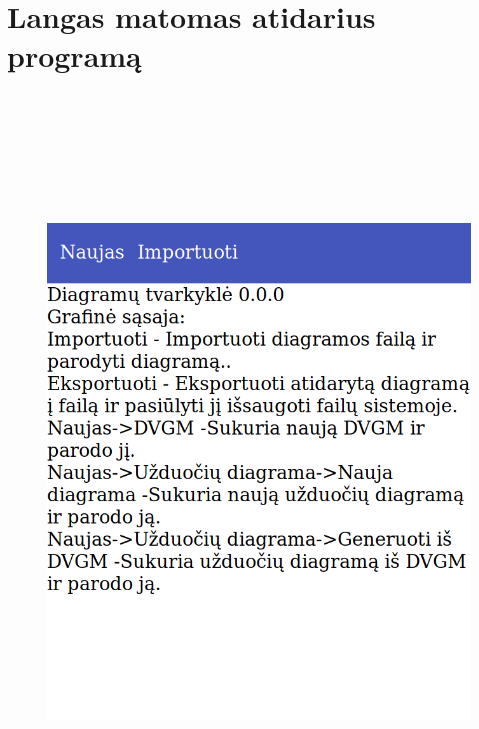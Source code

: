 \documentclass{VUMIFInfBakalaurinis}
\begin{document}
\section{Langas matomas atidarius programą} \label{appendix:run_examples_welcome}
\begin{figure}[H]
    \centering
    \includegraphics[height=20cm]{img/appendix/run_examples/welcome}
\end{figure}
\end{document}
